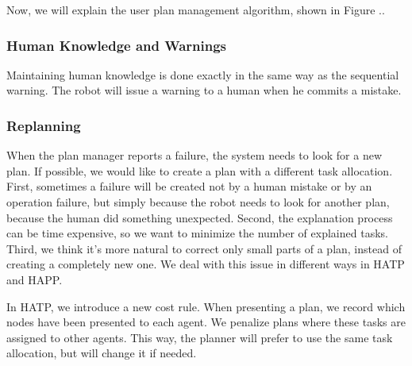 Now, we will explain the user plan management algorithm, shown in Figure ..

\subsubsection{Human Knowledge and Warnings}
Maintaining human knowledge is done exactly in the same way as the sequential warning. The robot will issue a warning to a human when he commits a mistake.

\subsubsection{Replanning}
When the plan manager reports a failure, the system needs to look for a new plan. If possible, we would like to create a plan with a different task allocation. First, sometimes a failure will be created not by a human mistake or by an operation failure, but simply because the robot needs to look for another plan, because the human did something unexpected. Second, the explanation process can be time expensive, so we want to minimize the number of explained tasks. Third, we think it's more natural to correct only small parts of a plan, instead of creating a completely new one. We deal with this issue in different ways in HATP and HAPP.

In HATP, we introduce a new cost rule. When presenting a plan, we record which nodes have been presented to each agent. We penalize plans where these tasks are assigned to other agents. This way, the planner will prefer to use the same task allocation, but will change it if needed.


